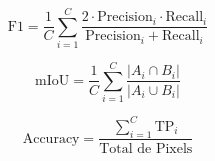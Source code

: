 \documentclass{article}
\begin{document}
\[
\text{F1} = \frac{1}{C} \sum_{i=1}^C \frac{2 \cdot \text{Precision}_i \cdot \text{Recall}_i}{\text{Precision}_i + \text{Recall}_i}
\]

\[
\text{mIoU} = \frac{1}{C} \sum_{i=1}^C \frac{|A_i \cap B_i|}{|A_i \cup B_i|}
\]

\[
\text{Accuracy} = \frac{\sum_{i=1}^C \text{TP}_i}{\text{Total de Pixels}}
\]
\end{document}
